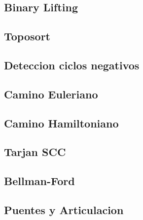 \documentclass[a4paper,11pt,landscape,twocolumn]{article}
\begin{document}


\subsection{Binary Lifting}



\subsection{Toposort}



\subsection{Deteccion ciclos negativos}



\subsection{Camino Euleriano}



\subsection{Camino Hamiltoniano}



\subsection{Tarjan SCC}



\subsection{Bellman-Ford}



\subsection{Puentes y Articulacion}


\end{document}
